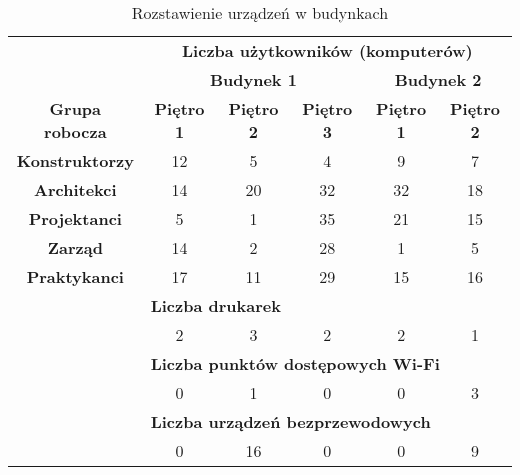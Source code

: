 \documentclass[a4paper, 12pt]{article}
\begin{document}
\begin{table}[H]
	\centering
	\begin{tabular}{l|c|c|c|c|c|}
	\cline{2-6}
	\multirow{2}{*}{}                   & \multicolumn{5}{c|}{\textbf{Liczba użytkowników (komputerów)}} \\ \cline{2-6} 
	                                    & \multicolumn{3}{c|}{\textbf{Budynek 1}}  & \multicolumn{2}{c|}{\textbf{Budynek 2}} \\ \hline
	\multicolumn{1}{|c|}{\textbf{Grupa robocza}} & \textbf{Piętro 1}  & \textbf{Piętro 2} & \textbf{Piętro 3} & \textbf{Piętro 1}       & \textbf{Piętro 2}      \\ \hline
	\multicolumn{1}{|c|}{\textbf{Konstruktorzy}} & 12        & 5        & 4        & 9              & 7             \\ \hline
	\multicolumn{1}{|c|}{\textbf{Architekci}}    & 14        & 20       & 32       & 32             & 18            \\ \hline
	\multicolumn{1}{|c|}{\textbf{Projektanci}}   & 5         & 1        & 35       & 21             & 15            \\ \hline
	\multicolumn{1}{|c|}{\textbf{Zarząd}}        & 14        & 2        & 28       & 1              & 5             \\ \hline
	\multicolumn{1}{|c|}{\textbf{Praktykanci}}   & 17        & 11       & 29       & 15             & 16            \\ \hline
	\multirow{6}{*}{}                   & \multicolumn{5}{l|}{\textbf{Liczba drukarek}}                             \\ \cline{2-6} 
	                                    & 2         & 3        & 2        & 2              & 1             \\ \cline{2-6} 
	                                    & \multicolumn{5}{l|}{\textbf{Liczba punktów dostępowych Wi-Fi}}            \\ \cline{2-6} 
	                                    & 0         & 1        & 0        & 0              & 3             \\ \cline{2-6} 
	                                    & \multicolumn{5}{l|}{\textbf{Liczba urządzeń bezprzewodowych}}             \\ \cline{2-6} 
	                                    & 0         & 16       & 0        & 0              & 9             \\ \cline{2-6} 
	\end{tabular}
	\caption{Rozstawienie urządzeń w budynkach}
\end{table}
\end{document}
